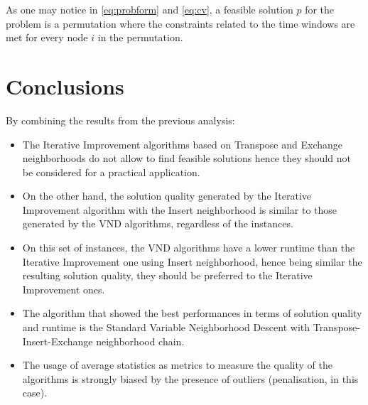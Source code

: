 \documentclass{article}
\begin{document}
As one may notice in \ref{eq:probform} and \ref{eq:cv}, a feasible solution $p$ for the problem is a permutation where the constraints related to the time windows are met for every node $i$ in the permutation.







\section{Conclusions}
By combining the results from the previous analysis:
\begin{itemize}
  \item The Iterative Improvement algorithms based on Transpose and Exchange neighborhoods do not allow to find feasible solutions hence they should not be considered for a practical application.
  \item On the other hand, the solution quality generated by the Iterative Improvement algorithm with the Insert neighborhood is similar to those generated by the VND algorithms, regardless of the instances.
  \item On this set of instances, the VND algorithms have a lower runtime than the Iterative Improvement one using Insert neighborhood, hence being similar the resulting solution quality, they should be preferred to the Iterative Improvement ones.
  \item The algorithm that showed the best performances in terms of solution quality and runtime is the Standard Variable Neighborhood Descent with Transpose-Insert-Exchange neighborhood chain.
  \item The usage of average statistics as metrics to measure the quality of the algorithms is strongly biased by the presence of outliers (penalisation, in this case).
\end{itemize}





\end{document}
